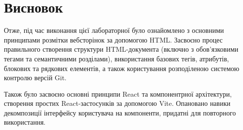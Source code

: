 \documentclass[12pt, a4paper]{article}
\begin{document}
\section{Висновок}
Отже, під час виконання цієї лабораторної було ознайомлено з основними принципами розмітки вебсторінок за допомогою HTML. Засвоєно процес правильного створення структури HTML-документа (включно з обов'язковими тегами та семантичними розділами), використання базових тегів, атрибутів, блокових та рядкових елементів, а також користування розподіленою системою контролю версій Git.

Також було засвоєно основні принципи React та компонентрної архітектури, створення простих React-застосунків за допомогою Vite. Опановано навики декомпозиції інтерфейсу користувача на компоненти, придатні для повторного використання.
\end{document}
